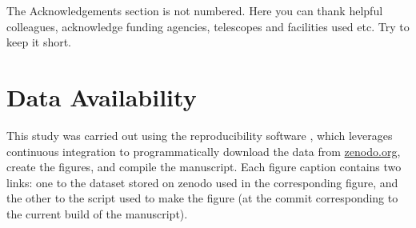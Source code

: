 \documentclass[fleqn,usenatbib]{mnras}
\begin{document}
The Acknowledgements section is not numbered. Here you can thank helpful
colleagues, acknowledge funding agencies, telescopes and facilities used etc.
Try to keep it short.

\section*{Data Availability}

 
This study was carried out using the reproducibility software
\href{https://github.com/showyourwork/showyourwork}{\showyourwork}
\citep{Luger2021MappingModel}, which leverages continuous integration to
programmatically download the data from
\href{https://zenodo.org/}{zenodo.org}, create the figures, and
compile the manuscript. Each figure caption contains two links: one
to the dataset stored on zenodo used in the corresponding figure,
and the other to the script used to make the figure (at the commit
corresponding to the current build of the manuscript).
















\bsp	%
\end{document}
